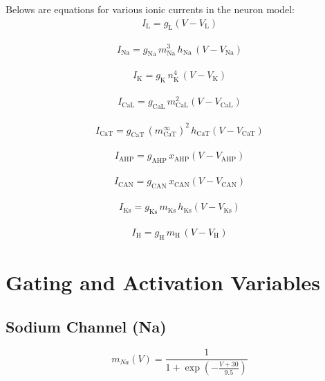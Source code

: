 \documentclass{article}
\begin{document}
Belows are equations for various ionic currents in the neuron model:
\begin{align}
I_\mathrm{L} = g_\mathrm{L}(V - V_\mathrm{L})
\end{align}

\begin{align}
I_\mathrm{Na} = g_\mathrm{Na} \, m_\mathrm{Na}^3 \, h_\mathrm{Na} \, (V - V_\mathrm{Na})
\end{align}

\begin{align}
I_\mathrm{K} = g_\mathrm{K} \, n_\mathrm{K}^4 \, (V - V_\mathrm{K})
\end{align}

\begin{align}
I_\mathrm{CaL} = g_\mathrm{CaL} \, m_\mathrm{CaL}^2 (V - V_\mathrm{CaL})
\end{align}

\begin{align}
I_\mathrm{CaT} = g_\mathrm{CaT} \, (m_\mathrm{CaT}^{\infty})^2 \, h_\mathrm{CaT} (V - V_\mathrm{CaT})
\end{align}

\begin{align}
I_\mathrm{AHP} = g_\mathrm{AHP} \, x_\mathrm{AHP} (V - V_\mathrm{AHP})
\end{align}

\begin{align}
I_\mathrm{CAN} = g_\mathrm{CAN} \, x_\mathrm{CAN} (V - V_\mathrm{CAN})
\end{align}

\begin{align}
I_\mathrm{Ks} = g_\mathrm{Ks} \, m_\mathrm{Ks} \, h_\mathrm{Ks} (V - V_\mathrm{Ks})
\end{align}

\begin{align}
I_\mathrm{H} = g_\mathrm{H} \, m_\mathrm{H} \, (V - V_\mathrm{H})
\end{align}

\section*{Gating and Activation Variables}

\subsection*{Sodium Channel (Na)}
\begin{equation}
m_{Na}(V) = \frac{1}{1 + \exp\left(-\frac{V + 30}{9.5}\right)}
\end{equation}
\end{document}
